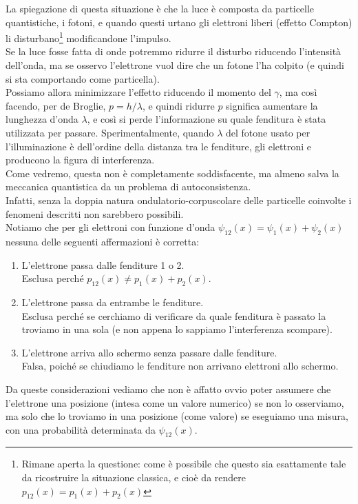 \documentclass[FisicaTeorica.tex]{subfiles}
\begin{document}
La spiegazione  di questa situazione è che la luce è composta da particelle quantistiche, i fotoni, e quando questi urtano gli elettroni liberi (effetto Compton) li disturbano\footnote{Rimane aperta la questione: come è possibile che questo  sia esattamente tale da ricostruire la situazione classica, e cioè da rendere $p_{12}(x) = p_1(x) + p_2(x)$} modificandone l'impulso.\\
Se la luce fosse fatta di onde potremmo ridurre il disturbo riducendo l'intensità dell'onda, ma se osservo l'elettrone vuol dire che un fotone l'ha colpito (e quindi si sta comportando come particella).\\
Possiamo allora minimizzare l'effetto riducendo il momento del $\gamma$, ma così facendo, per de Broglie, $p = h / \lambda$, e quindi ridurre $p$ significa aumentare la lunghezza d'onda $\lambda$, e così si perde l'informazione su quale fenditura è stata utilizzata per passare. Sperimentalmente, quando $\lambda$ del fotone usato per l'illuminazione è dell'ordine della distanza tra le fenditure, gli elettroni  e producono la figura di interferenza.\\
Come vedremo, questa  non è completamente soddisfacente, ma almeno salva la meccanica quantistica da un problema di autoconsistenza.\\
Infatti, senza la doppia natura ondulatorio-corpuscolare delle particelle coinvolte i fenomeni descritti non sarebbero possibili.\\
Notiamo che per gli elettroni con funzione d'onda
$\psi_{12}(x) = \psi_1(x) + \psi_2(x)$
nessuna delle seguenti affermazioni è corretta:
\begin{enumerate}
    \item L'elettrone passa dalle fenditure 1 o 2.\\
    Esclusa perché $p_{12}(x) \neq p_1(x) + p_2(x)$.
    \item L'elettrone passa da entrambe le fenditure.\\
    Esclusa perché se cerchiamo di verificare da quale fenditura è passato la troviamo in una sola (e non appena lo sappiamo l'interferenza scompare).
    \item L'elettrone arriva allo schermo senza passare dalle fenditure.\\ Falsa, poiché se chiudiamo le fenditure non arrivano elettroni allo schermo.
\end{enumerate}
Da queste considerazioni vediamo che non è affatto ovvio poter assumere che l'elettrone  una posizione (intesa come un valore numerico) se non lo osserviamo, ma solo che lo troviamo in una posizione (come valore) se eseguiamo una misura, con una probabilità determinata da $\psi_{12}(x)$.
\end{document}
